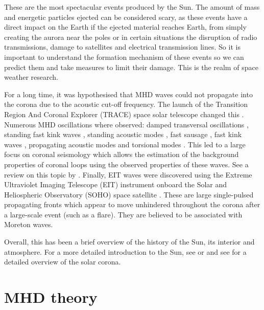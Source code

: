     These are the most spectacular events produced by the Sun.
    The amount of mass and energetic particles ejected can be considered scary, as these events have a direct impact on the Earth if the ejected material reaches Earth, from simply creating the aurora near the poles or in certain situations the disruption of radio transmissions, damage to satellites and electrical transmission lines.
    So it is important to understand the formation mechanism of these events so we can predict them and take measures to limit their damage.
    This is the realm of space weather research. 
    
    For a long time, it was hypothesised that MHD waves could not propagate into the corona due to the acoustic cut-off frequency.
    The launch of the Transition Region And Coronal Explorer (TRACE) space solar telescope changed this \citep{TRACE,TRACE1}.
    Numerous MHD oscillations where observed: damped transversal oscillations \citep{8007,2002A&A...394L..39G}, standing fast kink waves \citep{1999ApJ520880A,1999Sci...285..862N,1999SoPh..187..261S}, standing acoustic modes \citep{2003A&A...406.1105W}, fast sausage \citep{2001MNRAS.326..428W,2002MNRAS.336..747W,2003A&A...406..709K}, fast kink waves \citep{2005A&A...430L..65V}, propagating acoustic modes \citep{1997ApJ...491L.111O,2000A&A...355L..23D,2002A&A...393..649M} and torsional modes \citep{1998A&A...337..287E}. 
    This led to a large focus on coronal seismology which allows the estimation of the background properties of coronal loops using the observed properties of these waves.
    See a review on this topic by \cite{lrsp-2005-3}.
    Finally, EIT waves were discovered using the Extreme Ultraviolet Imaging Telescope (EIT) instrument onboard the Solar and Heliospheric Observatory (SOHO) space satellite \citep{1998GeoRL..25.2465T}.
    These are large single-pulsed propagating fronts which appear to move unhindered throughout the corona after a large-scale event (such as a flare).
    They are believed to be associated with Moreton waves.
        
    Overall, this has been a brief overview of the history of the Sun, its interior and atmosphere. 
    For a more detailed introduction to the Sun, see \cite{priest1984solar} or \cite{2014masu.book.....P} and see \cite{markus2004physics} for a detailed overview of the solar corona.
    
\section{MHD theory}

